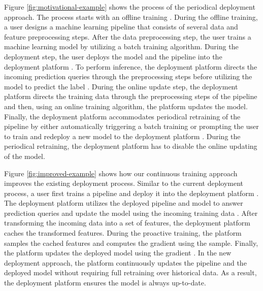 Figure \ref{fig:motivational-example} shows the process of the periodical deployment approach.
The process starts with an offline training .
During the offline training, a user designs a machine learning pipeline that consists of several data and feature preprocessing steps. 
After the data preprocessing step, the user trains a machine learning model by utilizing a batch training algorithm.
During the deployment step, the user deploys the model and the pipeline into the deployment platform .
To perform inference, the deployment platform directs the incoming prediction queries through the preprocessing steps before utilizing the model to predict the label .
During the online update step, the deployment platform directs the training data through the preprocessing steps of the pipeline and then, using an online training algorithm, the platform updates the model.
Finally, the deployment platform accommodates periodical retraining of the pipeline by either automatically triggering a batch training or prompting the user to train and redeploy a new model to the deployment platform .
During the periodical retraining, the deployment platform has to disable the online updating of the model.

Figure \ref{fig:improved-example} shows how our continuous training approach improves the existing deployment process.
Similar to the current deployment process, a user first trains a pipeline  and deploy it into the deployment platform .
The deployment platform utilizes the deployed pipeline and model to answer prediction queries and update the model using the incoming training data .
After transforming the incoming data into a set of features, the deployment platform caches the transformed features.
During the proactive training, the platform samples the cached features and computes the gradient using the sample.
Finally, the platform updates the deployed model using the gradient .
In the new deployment approach, the platform continuously updates the pipeline and the deployed model without requiring full retraining over historical data.
As a result, the deployment platform ensures the model is always up-to-date.